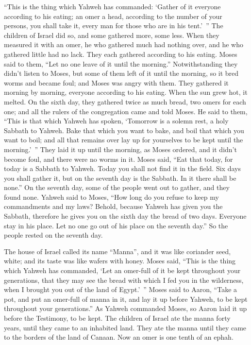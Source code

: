 {“This is the thing which Yahweh has commanded: ‘Gather of it everyone according to his eating; an omer a head, according to the number of your persons, you shall take it, every man for those who are in his tent.’ ”
The children of Israel did so, and some gathered more, some less.
When they measured it with an omer, he who gathered much had nothing over, and he who gathered little had no lack. They each gathered according to his eating.
Moses said to them, “Let no one leave of it until the morning.”
Notwithstanding they didn’t listen to Moses, but some of them left of it until the morning, so it bred worms and became foul; and Moses was angry with them.
They gathered it morning by morning, everyone according to his eating. When the sun grew hot, it melted.
On the sixth day, they gathered twice as much bread, two omers for each one; and all the rulers of the congregation came and told Moses.
He said to them, “This is that which Yahweh has spoken, ‘Tomorrow is a solemn rest, a holy Sabbath to Yahweh. Bake that which you want to bake, and boil that which you want to boil; and all that remains over lay up for yourselves to be kept until the morning.’ ”
They laid it up until the morning, as Moses ordered, and it didn’t become foul, and there were no worms in it.
Moses said, “Eat that today, for today is a Sabbath to Yahweh. Today you shall not find it in the field.
Six days you shall gather it, but on the seventh day is the Sabbath. In it there shall be none.”
On the seventh day, some of the people went out to gather, and they found none.
Yahweh said to Moses, “How long do you refuse to keep my commandments and my laws?
Behold, because Yahweh has given you the Sabbath, therefore he gives you on the sixth day the bread of two days. Everyone stay in his place. Let no one go out of his place on the seventh day.”
So the people rested on the seventh day.
\par }{\PP {}The house of Israel called its name “Manna”, and it was like coriander seed, white; and its taste was like wafers with honey.
Moses said, “This is the thing which Yahweh has commanded, ‘Let an omer-full of it be kept throughout your generations, that they may see the bread with which I fed you in the wilderness, when I brought you out of the land of Egypt.’ ”
Moses said to Aaron, “Take a pot, and put an omer-full of manna in it, and lay it up before Yahweh, to be kept throughout your generations.”
As Yahweh commanded Moses, so Aaron laid it up before the Testimony, to be kept.
The children of Israel ate the manna forty years, until they came to an inhabited land. They ate the manna until they came to the borders of the land of Canaan.
Now an omer is one tenth of an ephah.

}

